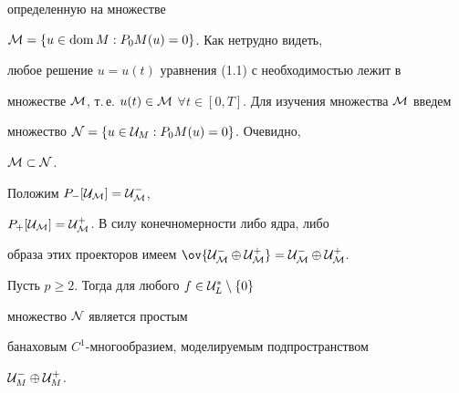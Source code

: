 определенную на множестве


${\cal M} = \{u\in\operatorname{dom} M : P_0 M(u)=0\}$. Как нетрудно видеть,


любое решение $u=u(t)$ уравнения (1.1) с необходимостью лежит в


множестве ${\cal M}$, т.\,е. $u(t)\in{\cal M}$\; $\forall t\in [0,


T]$. Для изучения множества ${\cal M}$ введем 


множество ${\cal N} = \{u\in {\cal U}_M : P_0 M(u)=0\}$. Очевидно,


${\cal M}\subset {\cal N}$.





Положим $P_-[\cal U_M]=\cal U^-_M$,


$P_+[\cal U_M]=\cal U^+_M$. В силу конечномерности либо ядра, либо


образа этих проекторов имеем $\ov{\cal U^-_M\oplus\cal U^+_M}=


\cal U^-_M\oplus \cal U^+_M$.





\begin{thms}


Пусть $p\ge 2$. Тогда для любого $f\in {\cal U}_L^*\setminus\{0\}$


множество ${\cal N}$ является простым


банаховым $C^1$-многообразием, моделируемым подпространством


${\cal U}_M^-\oplus{\cal U}_M^+$.


\end{thms}





